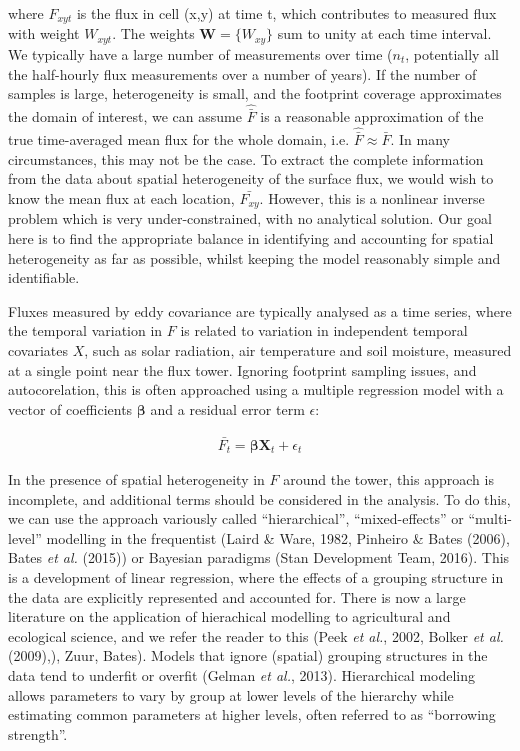 where \(F_{xyt}\) is the flux in cell (x,y) at time t, which contributes to measured flux with weight \(W_{xyt}\). The weights
\(\mathbf{W} = \{W_{xy}\}\) sum to unity at each time interval. We
typically have a large number of measurements over time (\(n_t\),
potentially all the half-hourly flux measurements over a number of
years). If the number of samples is large, heterogeneity is small, and
the footprint coverage approximates the domain of interest, we can
assume \(\widehat{\bar{F}}\) is a reasonable approximation of the true
time-averaged mean flux for the whole domain, i.e.
\(\widehat{\bar{F}} \approx \bar{F}\). In many circumstances, this may
not be the case. To extract the complete information from the data about
spatial heterogeneity of the surface flux, we would wish to know the
mean flux at each location, \(\bar{F_{xy}}\). However, this is a
nonlinear inverse problem which is very under-constrained, with no
analytical solution. Our goal here is to find the appropriate balance in
identifying and accounting for spatial heterogeneity as far as possible,
whilst keeping the model reasonably simple and identifiable.

Fluxes measured by eddy covariance are typically analysed as a time
series, where the temporal variation in \(F\) is related to variation in
independent temporal covariates \(X\), such as solar radiation, air
temperature and soil moisture, measured at a single point near the flux
tower. Ignoring footprint sampling issues, and autocorelation, this is
often approached using a multiple regression model with a vector of
coefficients \(\boldsymbol{\beta}\) and a residual error term
\(\epsilon\):

\begin{align}   \label{eq:timeVarn}
  \bar{F_t} = \boldsymbol{\beta} \mathbf{X}_t + \epsilon_{t}
\end{align}

In the presence of spatial heterogeneity in \(F\) around the tower, this
approach is incomplete, and additional terms should be considered in the
analysis. To do this, we can use the approach variously called
``hierarchical'', ``mixed-effects'' or ``multi-level'' modelling in the
frequentist (Laird \& Ware, 1982, Pinheiro \& Bates (2006), Bates
\emph{et al.} (2015)) or Bayesian paradigms (Stan Development Team,
2016). This is a development of linear regression, where the effects of
a grouping structure in the data are explicitly represented and
accounted for. There is now a large literature on the application of
hierachical modelling to agricultural and ecological science, and we
refer the reader to this (Peek \emph{et al.}, 2002, Bolker \emph{et al.}
(2009),), Zuur, Bates). Models that ignore (spatial) grouping structures
in the data tend to underfit or overfit (Gelman \emph{et al.}, 2013).
Hierarchical modeling allows parameters to vary by group at lower levels
of the hierarchy while estimating common parameters at higher levels,
often referred to as ``borrowing strength''.

